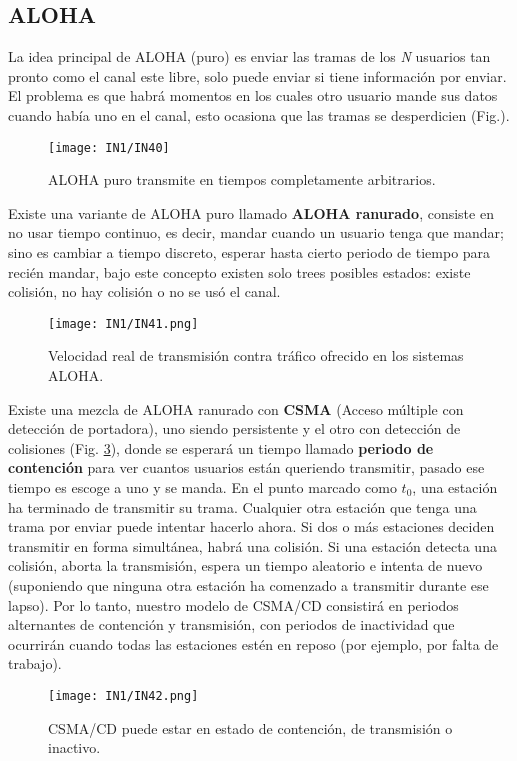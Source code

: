 \documentclass[
	12pt, %
	fleqn, %
	a4paper, %
	oneside, %
]{LegrandOrangeBook}
\begin{document}
\subsection{ALOHA}
La idea principal de ALOHA (puro) es enviar las tramas de los \textit{N} usuarios tan pronto como el canal este libre, solo puede enviar si tiene información por enviar. El problema es que habrá momentos en los cuales otro usuario mande sus datos cuando había uno en el canal, esto ocasiona que las tramas se desperdicien (Fig.).
\begin{figure}[]
\centering
\texttt{[image: IN1/IN40]}
\caption{ALOHA puro transmite en tiempos completamente arbitrarios.}
\label{fig:ALOHA puro}
\end{figure}
Existe una variante de ALOHA puro llamado \textbf{ALOHA ranurado}, consiste en no usar tiempo continuo, es decir, mandar cuando un usuario tenga que mandar; sino es cambiar a tiempo discreto, esperar hasta cierto periodo de tiempo para recién mandar, bajo este concepto existen solo trees posibles estados: existe colisión, no hay colisión o no se usó el canal.
\begin{figure}[]
\centering
\texttt{[image: IN1/IN41.png]}
\caption{Velocidad real de transmisión contra tráfico ofrecido en los sistemas ALOHA.}
\label{fig:Velocidad de alohas}
\end{figure}
Existe una mezcla de ALOHA ranurado con \textbf{CSMA}   (Acceso múltiple con detección de portadora), uno siendo persistente y el otro con detección de colisiones (Fig. \ref{fig:CSMA CD}), donde se esperará un tiempo llamado \textbf{periodo de contención} para ver cuantos usuarios están queriendo transmitir, pasado ese tiempo es escoge a uno y se manda. En el punto marcado como $t_0$, una estación ha terminado de transmitir su trama. Cualquier otra estación que tenga una trama por enviar puede intentar hacerlo ahora. Si dos o más estaciones deciden transmitir en forma simultánea, habrá una colisión. Si una estación detecta una colisión, aborta la transmisión, espera un tiempo aleatorio e intenta de nuevo (suponiendo que ninguna otra estación ha comenzado a transmitir durante ese lapso). Por lo tanto, nuestro modelo de CSMA/CD consistirá en periodos alternantes de contención y transmisión, con periodos de inactividad que ocurrirán cuando todas las estaciones estén en reposo (por ejemplo, por falta de trabajo).
\begin{figure}[]
\centering
\texttt{[image: IN1/IN42.png]}
\caption{CSMA/CD puede estar en estado de contención, de transmisión o inactivo.}
\label{fig:CSMA CD}
\end{figure}
\end{document}
